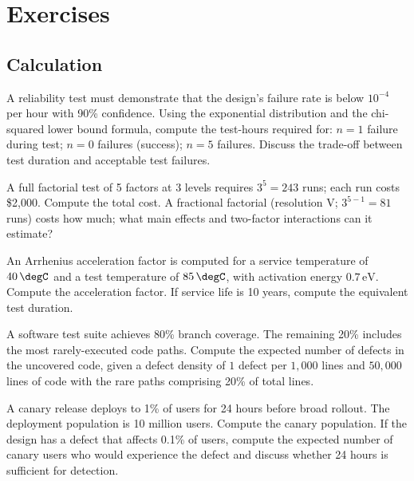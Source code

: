 \section{Exercises}

\subsection*{Calculation}

\begin{exercise}
A reliability test must demonstrate that the design's failure rate is below $10^{-4}$ per hour with 90\% confidence. Using the exponential distribution and the chi-squared lower bound formula, compute the test-hours required for: $n = 1$ failure during test; $n = 0$ failures (success); $n = 5$ failures. Discuss the trade-off between test duration and acceptable test failures.
\end{exercise}

\begin{exercise}
A full factorial test of 5 factors at 3 levels requires $3^5 = 243$ runs; each run costs \$2{,}000. Compute the total cost. A fractional factorial (resolution V; $3^{5-1} = 81$ runs) costs how much; what main effects and two-factor interactions can it estimate?
\end{exercise}

\begin{exercise}
An Arrhenius acceleration factor is computed for a service temperature of $40\,\degC$ and a test temperature of $85\,\degC$, with activation energy $0.7\,\text{eV}$. Compute the acceleration factor. If service life is 10 years, compute the equivalent test duration.
\end{exercise}

\begin{exercise}
A software test suite achieves 80\% branch coverage. The remaining 20\% includes the most rarely-executed code paths. Compute the expected number of defects in the uncovered code, given a defect density of $1$ defect per $1{,}000$ lines and $50{,}000$ lines of code with the rare paths comprising 20\% of total lines.
\end{exercise}

\begin{exercise}
A canary release deploys to 1\% of users for 24 hours before broad rollout. The deployment population is 10 million users. Compute the canary population. If the design has a defect that affects 0.1\% of users, compute the expected number of canary users who would experience the defect and discuss whether 24 hours is sufficient for detection.
\end{exercise}

